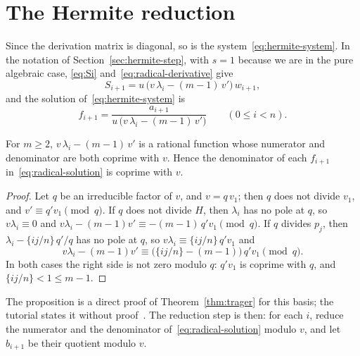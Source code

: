 \section{The Hermite reduction}\label{sec:radical-hermite}

Since the derivation matrix is diagonal, so is the
system~\eqref{eq:hermite-system}. In the notation of
Section~\ref{sec:hermite-step}, with $s = 1$ because we are in the pure
algebraic case, \eqref{eq:Si} and~\eqref{eq:radical-derivative} give
\[
  S_{i+1} = u\, \bigl( v\, \lambda_i - (m - 1)\, v' \bigr)\, w_{i+1} ,
\]
and the solution of~\eqref{eq:hermite-system} is
\begin{equation}\label{eq:radical-solution}
  f_{i+1} = \frac{a_{i+1}}{u\, \bigl( v\, \lambda_i - (m - 1)\, v' \bigr)}
  \qquad (0 \le i < n) .
\end{equation}

\begin{proposition}\label{prop:radical-hermite}
For $m \ge 2$, $v\,\lambda_i - (m - 1)\,v'$ is a rational function whose
numerator and denominator are both coprime with $v$. Hence the denominator
of each $f_{i+1}$ in~\eqref{eq:radical-solution} is coprime with $v$.
\end{proposition}

\begin{proof}
Let $q$ be an irreducible factor of $v$, and $v = q\, v_1$; then $q$ does not
divide $v_1$, and $v' \equiv q' v_1 \pmod q$. If $q$ does not divide $H$,
then $\lambda_i$ has no pole at $q$, so $v \lambda_i \equiv 0$ and $v
\lambda_i - (m - 1) v' \equiv -(m - 1)\, q' v_1 \pmod q$. If $q$ divides
$p_j$, then $\lambda_i - \{ij/n\}\, q'/q$ has no pole at $q$, so $v \lambda_i
\equiv \{ij/n\}\, q' v_1$ and
\[
  v \lambda_i - (m - 1) v' \equiv \bigl( \{ij/n\} - (m - 1) \bigr)\, q' v_1
  \pmod q .
\]
In both cases the right side is not zero modulo $q$: $q' v_1$ is coprime with
$q$, and $\{ij/n\} < 1 \le m - 1$.
\end{proof}

The proposition is a direct proof of Theorem~\ref{thm:trager} for this
basis; the tutorial states it without proof~\cite[\S2.2]{bronstein1998tutorial}.
The reduction step is then: for each $i$, reduce the numerator and the
denominator of~\eqref{eq:radical-solution} modulo $v$, and let $b_{i+1}$ be
their quotient modulo $v$.

